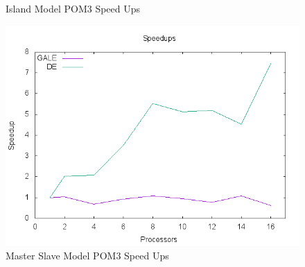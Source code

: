 \documentclass[conference]{IEEEtran}
\begin{document}
\begin{figure}[htbp]
\begin{minipage}{0.5\linewidth}
\begin{mdframed}
	\end{mdframed}
	\caption{Island Model POM3 Speed Ups}	
	\label{fig:POM3_island_speedups}
    \end{minipage}
    \begin{minipage}{0.5\linewidth}
    \centering
    \begin{mdframed}
		\includegraphics[width=\linewidth]{img/master-slave/pom3/speedups}
	\end{mdframed}
	\caption{Master Slave Model POM3 Speed Ups}	
	\label{fig:POM3_master_speedups}
    \end{minipage}
    \end{figure}
	
	\clearpage
	
\end{document}
